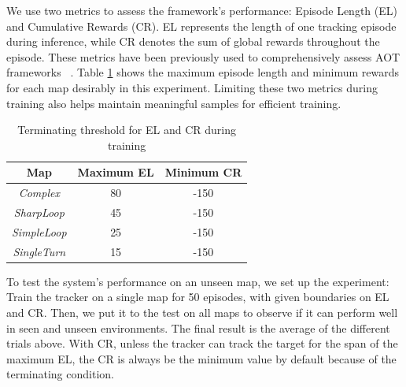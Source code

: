 \documentclass[sigconf]{aamas}
\begin{document}
We use two metrics to assess the framework's performance: Episode Length (EL) and Cumulative Rewards (CR). EL represents the length of one tracking episode during inference, while CR denotes the sum of global rewards throughout the episode. These metrics have been previously used to comprehensively assess AOT frameworks ~\cite{luo2019end}. Table \ref{tab:map_metrics} shows the maximum episode length and minimum rewards for each map desirably in this experiment. Limiting these two metrics during training also helps maintain meaningful samples for efficient training.
\begin{table}[h!]
    \centering
    \begin{tabular}{|c|c|c|}
        \hline
        \textbf{Map} & \textbf{Maximum EL} & \textbf{Minimum CR}\\
        \hline
        \textit{Complex} & 80 & -150\\
        \hline
        \textit{SharpLoop} & 45 & -150\\
        \hline
        \textit{SimpleLoop} & 25 & -150\\
        \hline
        \textit{SingleTurn} & 15 & -150\\
        \hline
    \end{tabular}
    \caption{Terminating threshold for EL and CR during training}
    \label{tab:map_metrics}
\end{table}

To test the system's performance on an unseen map, we set up the experiment: Train the tracker on a single map for 50 episodes, with given boundaries on EL and CR. Then, we put it to the test on all maps to observe if it can perform well in seen and unseen environments. The final result is the average of the different trials above. With CR, unless the tracker can track the target for the span of the maximum EL, the CR is always be the minimum value by default because of the terminating condition.
\end{document}
